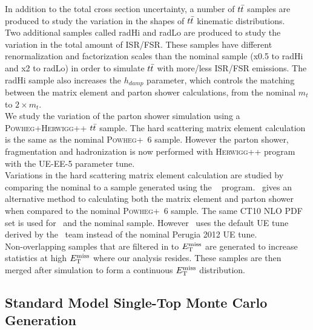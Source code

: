 \indent In addition to the total cross section uncertainty, a number of $t\bar{t}$ samples are produced to study the variation in the shapes of $t\bar{t}$ kinematic distributions. \\
\indent  Two additional samples called radHi and radLo are produced to study the variation in the total amount of ISR/FSR.  These samples have different renormalization and factorization scales than the nominal sample (x0.5 to radHi and x2 to radLo) in order to simulate $t\bar{t}$ with more/less ISR/FSR emissions. The radHi sample also increases the $h_{damp}$ parameter, which controls the matching between the matrix element and parton shower calculations, from the nominal $m_{t}$ to $2 \times m_{t}$. \\

\indent We study the variation of the parton shower simulation using a \textsc{Powheg+Herwigg++} $t\bar{t}$ sample. The hard scattering matrix element calculation is the same as the nominal \textsc{Powheg+\pythia~6} sample.  However the parton shower, fragmentation and hadronization is now performed with \textsc{Herwigg++} program with the UE-EE-5 parameter tune.\cite{Herwigg,CTEQ6L1}  \\%

\indent Variations in the hard scattering matrix element calculation are studied by comparing the nominal to a sample generated using the \sherpa~\cite{sherpa} program.  \sherpa~gives an alternative method to calculating both the matrix element and parton shower when compared to the nominal \textsc{Powheg+\pythia~6} sample.  The same CT10 NLO PDF set is used for \sherpa~and the nominal sample.  However \sherpa~uses the default UE tune derived by the \sherpa~team instead of the nominal Perugia 2012 UE tune. \\ 

\indent Non-overlapping samples that are filtered in to $E_{\mathrm{T}}^{\mathrm{miss}}$ are generated to increase statistics at high $E_{\mathrm{T}}^{\mathrm{miss}}$ where our analysis resides.  These samples are then merged after simulation to form a  continuous $E_{\mathrm{T}}^{\mathrm{miss}}$ distribution. \\

\subsection{Standard Model Single-Top Monte Carlo Generation}

